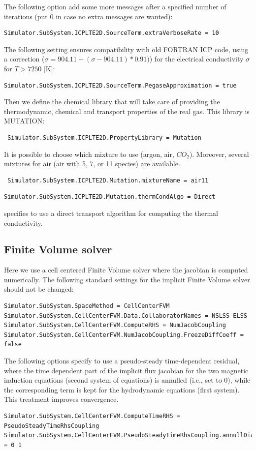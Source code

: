 \documentclass[11pt]{article}
\begin{document}
The following option add some more messages after a specified number of iterations 
(put 0 in case no extra messages are wanted):
\begin{verbatim}
Simulator.SubSystem.ICPLTE2D.SourceTerm.extraVerboseRate = 10
\end{verbatim}
The following setting ensures compatibility with old FORTRAN ICP code, using a 
correction ($\sigma = 904.11 + (\sigma-904.11)*0.91)$) for the 
electrical conductivity $\sigma$ for $T>7250$ [K]:
\begin{verbatim}
Simulator.SubSystem.ICPLTE2D.SourceTerm.PegaseApproximation = true
\end{verbatim}

Then we define the chemical library that will take care of providing the 
thermodynamic, chemical and transport properties of the real gas. 
This library is MUTATION:
\begin{verbatim}
 Simulator.SubSystem.ICPLTE2D.PropertyLibrary = Mutation
\end{verbatim}
It is possible to choose which mixture to use (argon, air, $CO_2$). 
Moreover, several mixtures for air (air with 5, 7, or 11 species) are available.
\begin{verbatim}
 Simulator.SubSystem.ICPLTE2D.Mutation.mixtureName = air11
\end{verbatim}

\begin{verbatim}
Simulator.SubSystem.ICPLTE2D.Mutation.thermCondAlgo = Direct
\end{verbatim}
specifies to use a direct transport algorithm for computing the thermal conductivity.

\subsection{Finite Volume solver}

Here we use a cell centered Finite Volume solver where the jacobian is computed numerically.
The following standard settings for the implicit Finite Volume solver should not be changed:

\begin{verbatim}
Simulator.SubSystem.SpaceMethod = CellCenterFVM
Simulator.SubSystem.CellCenterFVM.Data.CollaboratorNames = NSLSS ELSS
Simulator.SubSystem.CellCenterFVM.ComputeRHS = NumJacobCoupling
Simulator.SubSystem.CellCenterFVM.NumJacobCoupling.FreezeDiffCoeff = false
\end{verbatim}

The following options specify to use a pseudo-steady time-dependent residual, 
where the time dependent part of the implicit flux jacobian for the two 
magnetic induction equations (second system of equations) is annulled 
(i.e., set to 0), while the corresponding term is kept for the 
hydrodynamic equations (first system). This treatment improves convergence.
\begin{verbatim}
Simulator.SubSystem.CellCenterFVM.ComputeTimeRHS = PseudoSteadyTimeRhsCoupling
Simulator.SubSystem.CellCenterFVM.PseudoSteadyTimeRhsCoupling.annullDiagValue = 0 1
\end{verbatim}
\end{document}
